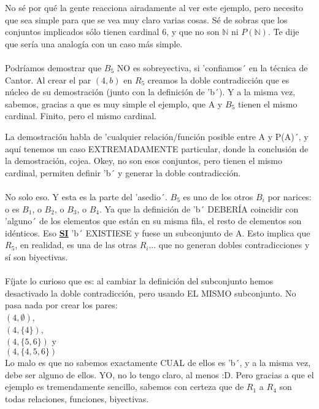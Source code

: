 	\noindent
	No sé por qué la gente reacciona airadamente al ver este ejemplo, pero necesito que sea simple para que se vea muy claro varias cosas. Sé de sobras que los conjuntos implicados sólo tienen cardinal 6, y que no son $\mathbb{N}$ ni $P(\mathbb{N})$. Te dije que sería una analogía con un caso más simple.\\\\
	
	\noindent
	Podríamos demostrar que $B_{5}$ NO es sobreyectiva, si 'confiamos´ en la técnica de Cantor. Al crear el par $(4, b)$ en $R_{5}$ creamos la doble contradicción que es núcleo de su demostración (junto con la definición de 'b´). Y a la misma vez, sabemos, gracias a que es muy simple el ejemplo, que A y $B_{5}$ tienen el mismo cardinal. Finito, pero el mismo cardinal.
	
	\noindent
	La demostración habla de 'cualquier relación/función posible entre A y P(A)´, y aquí tenemos un caso EXTREMADAMENTE particular, donde la conclusión de la demostración, cojea. Okey, no son esos conjuntos, pero tienen el mismo cardinal, permiten definir 'b´ y generar la doble contradicción. \\\\
	
	\noindent
	No solo eso. Y esta es la parte del 'asedio´. $B_{5}$ es uno de los otros $B_{i}$ por narices: o es $B_{1}$, o $B_{2}$, o $B_{3}$, o $B_{4}$. Ya que la definición de 'b´ DEBERÍA coincidir con 'alguno´ de los elementos que están en su misma fila, el resto de elementos son idénticos. Eso \textbf{\underline{SI}} 'b´ EXISTIESE y fuese un subconjunto de A. Esto implica que $R_{5}$, en realidad, es una de las otras $R_{i}$... que no generan dobles contradicciones y sí son biyectivas.\\\\
	
	\noindent
	Fíjate lo curioso que es: al cambiar la definición del subconjunto hemos desactivado la doble contradicción, pero usando EL MISMO subconjunto. No pasa nada por crear los pares:\\
	$(4, \emptyset)$, \\ 
	$(4, \{4\})$,     \\
	$(4, \{5,6\})$ y  \\
	$(4, \{4,5,6\})$  \\
	Lo malo es que no sabemos exactamente CUAL de ellos es 'b´, y a la misma vez, debe ser alguno de ellos. YO, no lo tengo claro, al menos :D. Pero gracias a que el ejemplo es tremendamente sencillo, sabemos con certeza que de $R_{1}$ a $R_{4}$ son todas relaciones, funciones, biyectivas.\\\\
	
